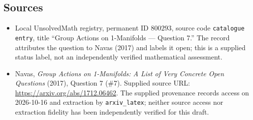 \documentclass[11pt]{article}
\begin{document}
\subsection{Sources}
\begin{itemize}
\item Local UnsolvedMath registry, permanent ID \(800293\), source code \texttt{catalogue entry}, title ``Group Actions on 1-Manifolds --- Question 7.'' The record attributes the question to Navas (2017) and labels it open; this is a supplied status label, not an independently verified mathematical assessment.
\item Navas, \emph{Group Actions on 1-Manifolds: A List of Very Concrete Open Questions} (2017), Question 7 (\#7). Supplied source URL: \url{https://arxiv.org/abs/1712.06462}. The supplied provenance records access on 2026-10-16 and extraction by \texttt{arxiv\_latex}; neither source access nor extraction fidelity has been independently verified for this draft.
\end{itemize}
\end{document}
